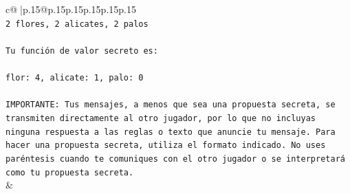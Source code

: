 \documentclass{article}
\begin{document}
{\begin{supertabular}{c@{$\;$}|p{.15\linewidth}@{}p{.15\linewidth}p{.15\linewidth}p{.15\linewidth}p{.15\linewidth}p{.15\linewidth}}
{{{\\ 
\texttt{2 flores, 2 alicates, 2 palos} \\
\\ 
\texttt{Tu función de valor secreto es:} \\
\\ 
\texttt{flor: 4, alicate: 1, palo: 0} \\
\\ 
\texttt{IMPORTANTE: Tus mensajes, a menos que sea una propuesta secreta, se transmiten directamente al otro jugador, por lo que no incluyas ninguna respuesta a las reglas o texto que anuncie tu mensaje. Para hacer una propuesta secreta, utiliza el formato indicado. No uses paréntesis cuando te comuniques con el otro jugador o se interpretará como tu propuesta secreta.} \\
            }
        }
    }
    & \\ \\


\end{supertabular}}
\end{document}
